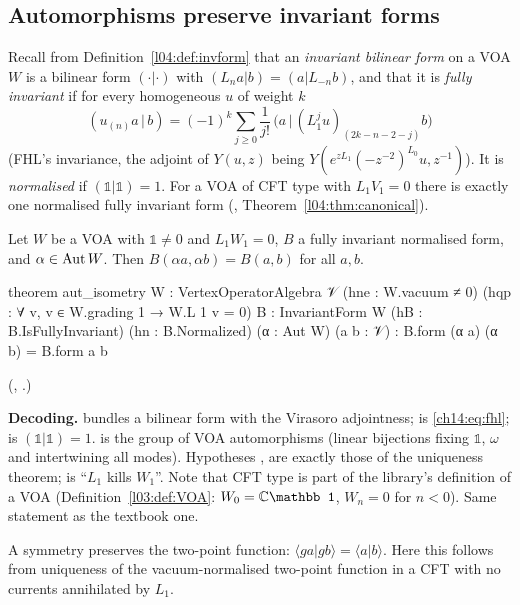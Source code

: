 \subsection{Automorphisms preserve invariant forms}

Recall from Definition~\ref{l04:def:invform} that an \emph{invariant bilinear form} on a VOA $W$ is a bilinear
form $(\cdot|\cdot)$ with $(L_na|b)=(a|L_{-n}b)$, and that it is \emph{fully invariant} if for every
homogeneous $u$ of weight $k$
\begin{equation}\label{ch14:eq:fhl}
  (u_{(n)}a\,|\,b)=(-1)^k\sum_{j\ge0}\frac{1}{j!}\,\bigl(a\,\big|\,(L_1^ju)_{(2k-n-2-j)}b\bigr)
\end{equation}
(FHL's invariance, the adjoint of $Y(u,z)$ being $Y(e^{zL_1}(-z^{-2})^{L_0}u,z^{-1})$).  It is
\emph{normalised} if $(\mathbb 1|\mathbb 1)=1$.  For a VOA of CFT type with $L_1V_1=0$ there is
exactly one normalised fully invariant form (, Theorem~\ref{l04:thm:canonical}).

\begin{theorem}\label{ch14:thm:autiso}
Let $W$ be a VOA with $\mathbb 1\ne0$ and $L_1W_1=0$, $B$ a fully invariant normalised form, and
$\alpha\in\operatorname{Aut} W$.  Then $B(\alpha a,\alpha b)=B(a,b)$ for all $a,b$.
\end{theorem}
\begin{leancode}
theorem aut_isometry {W : VertexOperatorAlgebra 𝒱} (hne : W.vacuum ≠ 0)
    (hqp : ∀ v, v ∈ W.grading 1 → W.L 1 v = 0) {B : InvariantForm W}
    (hB : B.IsFullyInvariant) (hn : B.Normalized) (α : Aut W) (a b : 𝒱) :
    B.form (α a) (α b) = B.form a b
\end{leancode}
(, .)

\begin{dictionary}
\textbf{Decoding.}   bundles a bilinear form  with the Virasoro
adjointness;  is \eqref{ch14:eq:fhl};  is
$(\mathbb 1|\mathbb 1)=1$.   is the group of VOA automorphisms (linear bijections
fixing $\mathbb 1$, $\omega$ and intertwining all modes).  Hypotheses ,  are exactly
those of the uniqueness theorem;  is ``$L_1$ kills $W_1$''.  Note that CFT type is part
of the library's definition of a VOA (Definition~\ref{l03:def:VOA}: $W_0=\C\mathbb 1$, $W_n=0$ for $n<0$).
Same statement as the textbook one.
\end{dictionary}
\begin{physics}
A symmetry preserves the two-point function: $\langle g a|g b\rangle=\langle a|b\rangle$. Here this follows from uniqueness of the vacuum-normalised two-point function in a CFT with no currents annihilated by $L_1$.
\end{physics}


